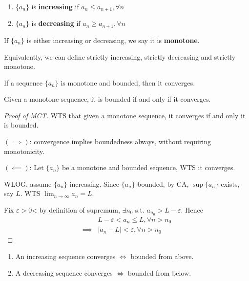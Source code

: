 \begin{definition}
    \hfill
    \begin{enumerate}
        \item $\{ a_n \} $ is \textbf{increasing} if $a_n \leq a_{n + 1}, \forall n$
        \item $\{ a_n \} $ is \textbf{decreasing} if $a_n \geq a_{n + 1}, \forall n$
    \end{enumerate}
    If $ \{ a_n \} $ is either increasing or 
    decreasing, we say it is \textbf{monotone}.
    \medskip

    Equivalently, we can define strictly increasing, strictly decreasing and
    strictly monotone.
\end{definition}

\begin{theorem}
    If a sequence $\{ a_n \} $ is monotone and bounded,
    then it converges. 
\end{theorem}

\begin{corollary}
    Given a monotone sequence, it is bounded if and only
    if it converges.
\end{corollary}

\begin{proof}[Proof of MCT]
    WTS that given a monotone sequence, 
    it converges if and only it is bounded.
    \medskip

    $(\implies)$: convergence implies boundedness always, 
    without requiring monotonicity.
    \medskip

    $(\impliedby)$:
    Let $\{ a_n \} $ be a monotone and bounded sequence, 
    WTS it converges. 
    \medskip

    WLOG, assume $\{ a_n \} $ increasing. 
    Since $ \{ a_n \} $ bounded, by CA, 
    $\sup \{ a_n \} $ exists, say $L$. 
    WTS $\lim_{n \to \infty}a_n = L$.
    \medskip 

    Fix $\varepsilon > 0$< by definition of supremum, 
    $\exists n_0$ s.t. $a_{n_0} > L-\varepsilon$.
    Hence 
    \begin{align*}
        & L - \varepsilon < a_n \leq L, \forall n > n_0 \\
        \implies & |a_n - L | < \varepsilon, \forall n > n_0
    \end{align*}
\end{proof}

\begin{remark}
    \hfill
    \begin{enumerate}
        \item An increasing sequence converges $\iff$ bounded from above.
        \item A decreasing sequence converges $\iff$ bounded from below.
    \end{enumerate}
\end{remark}

